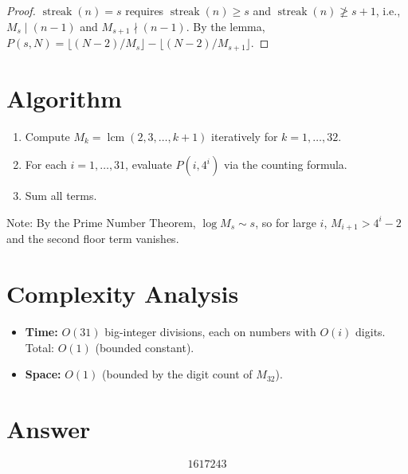 \documentclass[12pt]{article}
\begin{document}
\begin{proof}
$\operatorname{streak}(n) = s$ requires $\operatorname{streak}(n) \geq s$ and $\operatorname{streak}(n) \not\geq s+1$, i.e., $M_s \mid (n-1)$ and $M_{s+1} \nmid (n-1)$. By the lemma, $P(s,N) = \lfloor(N-2)/M_s\rfloor - \lfloor(N-2)/M_{s+1}\rfloor$.
\end{proof}

\section{Algorithm}

\begin{enumerate}
\item Compute $M_k = \operatorname{lcm}(2, 3, \ldots, k+1)$ iteratively for $k = 1, \ldots, 32$.
\item For each $i = 1, \ldots, 31$, evaluate $P(i, 4^i)$ via the counting formula.
\item Sum all terms.
\end{enumerate}

Note: By the Prime Number Theorem, $\log M_s \sim s$, so for large $i$, $M_{i+1} > 4^i - 2$ and the second floor term vanishes.

\section{Complexity Analysis}

\begin{itemize}
\item \textbf{Time:} $O(31)$ big-integer divisions, each on numbers with $O(i)$ digits. Total: $O(1)$ (bounded constant).
\item \textbf{Space:} $O(1)$ (bounded by the digit count of $M_{32}$).
\end{itemize}

\section{Answer}

\[
\boxed{1617243}
\]
\end{document}
